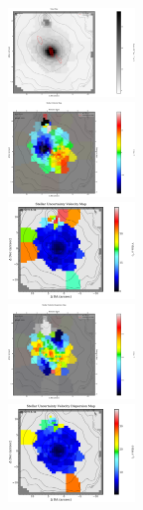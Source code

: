 \begin{figure}
      \centering
      \includegraphics[width=0.3\textwidth]{chapter4/Vmaps/pks0718-34_stellar_img.png}
      \\
      \includegraphics[width=0.3\textwidth]{chapter4/Vmaps/pks0718-34_stellar_vel.png}
      \\
      \includegraphics[width=0.3\textwidth]{chapter4/Vmaps/pks0718-34_stellar_vel_uncert.png}
      \\
      \includegraphics[width=0.3\textwidth]{chapter4/Vmaps/pks0718-34_stellar_sigma.png}
      \\
      \includegraphics[width=0.3\textwidth]{chapter4/Vmaps/pks0718-34_stellar_sigma_uncert.png}
      \\
\end{figure}

